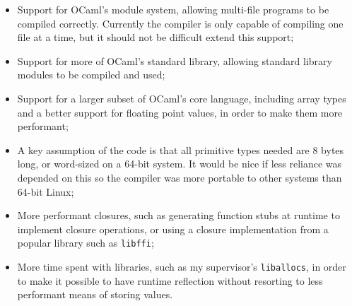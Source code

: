 \begin{itemize}
    \item Support for OCaml's module system, allowing multi-file programs to be 
    compiled correctly. Currently the compiler is only capable of compiling one 
    file at a time, but it should not be difficult extend this support;
    \item Support for more of OCaml's standard library, allowing standard 
    library modules to be compiled and used;
    \item Support for a larger subset of OCaml's core language, including array 
    types and a better support for floating point values, in order to make them 
    more performant;
    \item A key assumption of the code is that all primitive types needed are 8 
    bytes long, or word-sized on a 64-bit system. It would be nice if less 
    reliance was depended on this so the compiler was more portable to other 
    systems than 64-bit Linux;
    \item More performant closures, such as generating function stubs at 
    runtime to implement closure operations, or using a closure implementation 
    from a popular library such as \texttt{libffi};
    \item More time spent with libraries, such as my supervisor's 
    \texttt{liballocs}, in order to make it possible to have runtime reflection 
    without resorting to less performant means of storing values.
\end{itemize}
